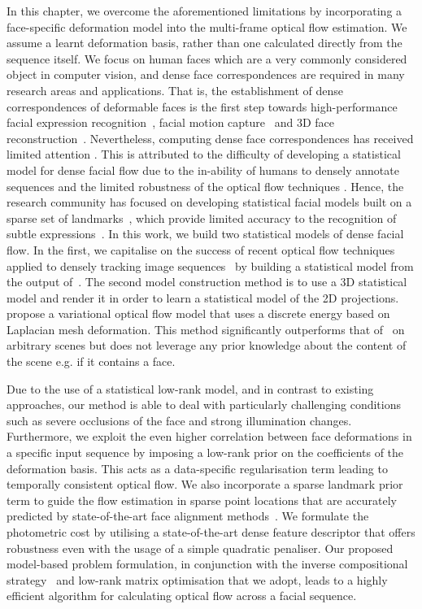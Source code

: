 In this chapter, we overcome the aforementioned limitations by incorporating a face-specific
deformation model into the multi-frame optical flow estimation. We assume a learnt
deformation basis, rather than one calculated directly from the sequence itself. We
focus on human faces which are a very commonly considered object in computer vision,
and dense face correspondences are required in many research areas and applications.
That is, the establishment of dense correspondences of deformable faces is the first step
towards high-performance facial expression recognition~\cite{koelstra2010dynamic},
facial motion capture~\cite{Beeler:2011ey} and 3D face reconstruction~\cite{garg2013dense}.
Nevertheless, computing dense face correspondences has received limited attention
\cite{decarlo2000optical,yacoob1996recognizing}. This is attributed to the difficulty of
developing a statistical model for dense facial flow due to the in-ability of humans to
densely annotate sequences and the limited robustness of the optical flow techniques
\cite{decarlo2000optical}. Hence, the research community has focused on developing
statistical facial models built on a sparse set of landmarks~\cite{xiong2013supervised},
which provide limited accuracy to the recognition of subtle expressions~\cite{li2013spontaneous}.
In this work, we build two statistical models of dense facial flow. In the first,
we capitalise on the success of recent optical flow techniques applied to
densely tracking image sequences~\cite{garg2013variational} by building a
statistical model from the output of~\cite{garg2013variational}. The second
model construction method is to use a 3D statistical model and render it in
order to learn a statistical model of the 2D projections.
\citet{li2013optical} propose a variational optical flow model that uses
a discrete energy based on Laplacian mesh deformation. This method
significantly outperforms that of~\cite{garg2013variational} on arbitrary
scenes but does not leverage any prior knowledge about the content of
the scene e.g. if it contains a face.

Due to the use of a statistical low-rank model, and in contrast to existing
approaches, our method is able to deal with
particularly challenging conditions such as severe occlusions of the face and strong
illumination changes. Furthermore, we exploit the even higher correlation
between face deformations in
a specific input sequence by imposing a low-rank prior on the coefficients of the
deformation basis. This acts as a data-specific regularisation term leading to
temporally consistent optical flow.
We also incorporate a sparse landmark prior term to guide the flow estimation in
sparse point locations that are accurately predicted by state-of-the-art face
alignment methods~\cite{kazemi2014one}.
We formulate the photometric cost by utilising a state-of-the-art dense
feature descriptor that offers robustness even with the usage of a simple
quadratic penaliser.
Our proposed model-based problem formulation, in conjunction with the inverse
compositional strategy~\cite{baker2004lucas} and low-rank matrix optimisation
that we adopt, leads to a highly efficient algorithm for calculating optical
flow across a facial sequence.
